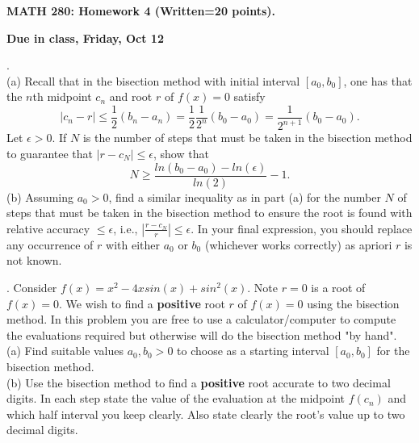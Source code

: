 \documentclass[12 pt]{article}
\begin{document}
\centerline{\bf MATH 280: Homework 4 (Written=20 points). }
\centerline{\bf Due in class, Friday, Oct 12}

\bigskip

. \\
(a) Recall that in the bisection method with initial interval $[a_0,b_0]$, one has 
that the $n$th midpoint $c_n$ and root $r$ of $f(x)=0$ satisfy 
$$
|c_n - r | \leq \frac{1}{2} (b_n-a_n) = \frac{1}{2} \frac{1}{2^n} (b_0-a_0) = \frac{1}{2^{n+1}} (b_0-a_0).
$$
Let $\epsilon > 0$. If $N$ is the number of steps that must be taken in the bisection method to guarantee that $|r-c_N| \leq \epsilon$, 
show that
$$
N \geq \frac{ln(b_0-a_0)-ln(\epsilon)}{ln(2)} - 1.
$$
(b) Assuming $a_0 > 0$, find a similar inequality as in part (a) for the number $N$ of steps that must be taken in the bisection method 
to ensure the root is found with relative accuracy $\leq \epsilon$, i.e., $|\frac{r-c_N}{r}| \leq \epsilon$. In your final expression, you should 
replace any occurrence of $r$ with either $a_0$ or $b_0$ (whichever works correctly) as apriori $r$ is not known.

\medskip

. Consider $f(x)=x^2-4xsin(x) + sin^2(x)$. Note $r=0$ is a root of $f(x)=0$. 
We wish to find a {\bf positive} root $r$ of $f(x)=0$ using the bisection method. In this problem 
you are free to use a calculator/computer to compute the evaluations required but otherwise will do the bisection method "by hand". \\
(a) Find suitable values $a_0, b_0 > 0$ to choose as a starting interval $[a_0,b_0]$ for the bisection method.  \\
(b) Use the bisection method to find a {\bf positive} root accurate to two decimal digits. In each step state the value of the evaluation at the midpoint $f(c_n)$ 
and which half interval you keep clearly. Also state clearly the root's value up to two decimal digits.




\medskip
\end{document}
